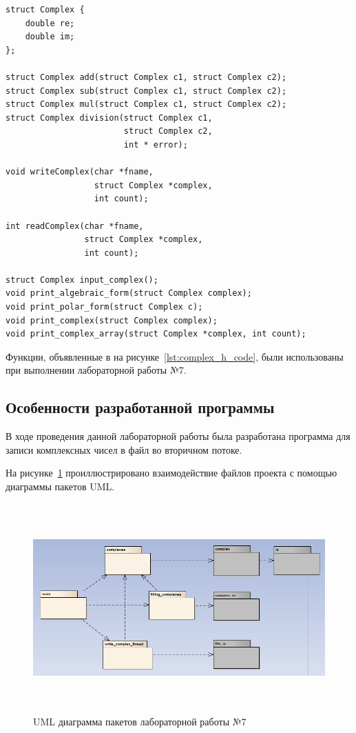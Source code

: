 \begin{lstlisting}[caption=Исходный код заголовочного файла complex.h,label=lst:complex_h_code]
struct Complex {
    double re;
    double im;
};

struct Complex add(struct Complex c1, struct Complex c2);
struct Complex sub(struct Complex c1, struct Complex c2);
struct Complex mul(struct Complex c1, struct Complex c2);
struct Complex division(struct Complex c1,
                        struct Complex c2,
                        int * error);

void writeComplex(char *fname,
                  struct Complex *complex,
                  int count);

int readComplex(char *fname,
                struct Complex *complex,
                int count);

struct Complex input_complex();
void print_algebraic_form(struct Complex complex);
void print_polar_form(struct Complex c);
void print_complex(struct Complex complex);
void print_complex_array(struct Complex *complex, int count);
\end{lstlisting}

Функции, объявленные в на рисунке~\ref{lst:complex_h_code},
были использованы при выполнении лабораторной работы №7.

\subsection{Особенности разработанной программы}

В ходе проведения данной лабораторной работы была разработана программа для записи комплексных чисел в файл во вторичном потоке.

На рисунке~\ref{fig:uml} проиллюстрировано взаимодействие файлов проекта с помощью диаграммы пакетов UML.

\begin{figure}[htbp]
  \centering
  \includegraphics[width=150mm,height=80mm]{img/uml}
  \caption{UML диаграмма пакетов лабораторной работы №7}\label{fig:uml}
\end{figure}

